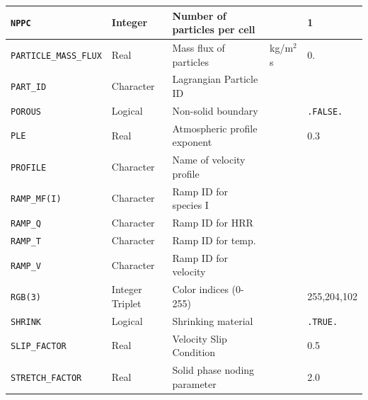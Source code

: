 \documentclass[11pt]{book}
\newcommand{\ct}{\tt\small}
\begin{document}
\begin{longtable}{|l|l|l|l|l|}
{\ct NPPC}                            & Integer         & Number of particles per cell      &                     & 1                       \\ \hline
{\ct PARTICLE\_MASS\_FLUX}            & Real            & Mass flux of particles            & kg/m$^2$ s          & 0.                      \\ \hline
{\ct PART\_ID}                        & Character       & Lagrangian Particle ID            &                     &                         \\ \hline
{\ct POROUS}                          & Logical         & Non-solid boundary                &                     & {\ct .FALSE.}           \\ \hline
{\ct PLE}                             & Real            & Atmospheric profile exponent      &                     & 0.3                     \\ \hline
{\ct PROFILE}                         & Character       & Name of velocity profile          &                     &                         \\ \hline
{\ct RAMP\_MF(I)}                     & Character       & Ramp ID for species I             &                     &                         \\ \hline
{\ct RAMP\_Q}                         & Character       & Ramp ID for HRR                   &                     &                         \\ \hline
{\ct RAMP\_T}                         & Character       & Ramp ID for temp.                 &                     &                         \\ \hline
{\ct RAMP\_V}                         & Character       & Ramp ID for velocity              &                     &                         \\ \hline
{\ct RGB(3)}                          & Integer Triplet & Color indices (0-255)             &                     & \small 255,204,102      \\ \hline
{\ct SHRINK}                          & Logical         & Shrinking material                &                     & {\ct .TRUE.}            \\ \hline
{\ct SLIP\_FACTOR    }                & Real            & Velocity Slip Condition           &                     & 0.5                     \\ \hline
{\ct STRETCH\_FACTOR    }             & Real            & Solid phase noding parameter      &                     & 2.0                     \\ \hline

\end{longtable}
\end{document}
